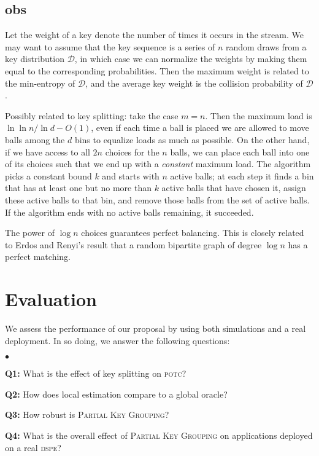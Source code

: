 \documentclass[10pt,conference,letterpaper]{IEEEtran}
\newenvironment {squishlist}
{\begin{list}{$\bullet$}
  { \setlength{\itemsep}{1pt}
     \setlength{\parsep}{1pt}
     \setlength{\topsep}{1pt}
     \setlength{\partopsep}{1pt}
     \setlength{\leftmargin}{1.5em}
     \setlength{\labelwidth}{1em}
     \setlength{\labelsep}{0.5em} } }
{\end{list}}
\newcommand{\potc}{\textsc{p\textup{o}tc}\xspace}
\newcommand{\dspe}{\textsc{dspe}\xspace}
\newcommand{\pkg}{\textsc{Partial Key Grouping}\xspace}
\begin{document}
{\subsection{obs}
Let the weight of a key denote the number of times it occurs in the stream.
We may want to assume that the key sequence is a series of $n$ random draws from a key distribution $\mathcal D$, in which case we can normalize the
 weights by making them equal to the corresponding probabilities. Then the maximum weight is related to the min-entropy of $\mathcal D$,
 and the average key weight is the collision probability of $\mathcal D$.


Possibly related to key splitting: take the case $m = n$. Then the maximum load is
 $\ln \ln n / \ln d - O(1)$, even if each time a ball is placed we are allowed to move balls among the $d$ bins to equalize loads as much as possible.
 On the other hand, if we have access to all $2 n$ choices for the $n$ balls, we can place each ball into one of its choices such that we end up with
 a \emph{constant} maximum load. The algorithm picks a constant bound $k$ and starts with $n$ active balls; at each step it finds a bin that has at
 least one but no more than $k$ active balls that have chosen it, assign these active balls to that bin, and remove those balls from the set of active
 balls. If the algorithm ends with no active balls remaining, it succeeded.

The power of $\log n$ choices guarantees perfect balancing. This is closely related to Erdos and Renyi's result that a random bipartite graph of degree $\log n$
has a perfect matching.
}

 \section{Evaluation}
\label{sec:evaluation}

We assess the performance of our proposal by using both simulations and a real deployment.
In so doing, we answer the following questions:
\begin{squishlist}
\item[\textbf{Q1:}]
What is the effect of key splitting on \potc?
\item[\textbf{Q2:}]
How does local estimation compare to a global oracle?
\item[\textbf{Q3:}]
How robust is \pkg? \item[\textbf{Q4:}]
What is the overall effect of \pkg on applications deployed on a real \dspe?
\end{squishlist}
\end{document}
